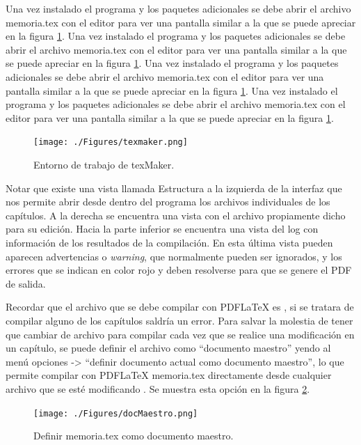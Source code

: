 Una vez instalado el programa y los paquetes adicionales se debe abrir el archivo memoria.tex con el editor para ver una pantalla similar a la que se puede apreciar en la figura \ref{fig:texmaker}. 
Una vez instalado el programa y los paquetes adicionales se debe abrir el archivo memoria.tex con el editor para ver una pantalla similar a la que se puede apreciar en la figura \ref{fig:texmaker}. 
Una vez instalado el programa y los paquetes adicionales se debe abrir el archivo memoria.tex con el editor para ver una pantalla similar a la que se puede apreciar en la figura \ref{fig:texmaker}. 
Una vez instalado el programa y los paquetes adicionales se debe abrir el archivo memoria.tex con el editor para ver una pantalla similar a la que se puede apreciar en la figura \ref{fig:texmaker}. 

\vspace{1cm}

\begin{figure}[htbp]
	\centering
	\texttt{[image: ./Figures/texmaker.png]}
	\caption{Entorno de trabajo de texMaker.}
	\label{fig:texmaker}
\end{figure}

\vspace{1cm}

Notar que existe una vista llamada Estructura a la izquierda de la interfaz que nos permite abrir desde dentro del programa los archivos individuales de los capítulos.  A la derecha se encuentra una vista con el archivo propiamente dicho para su edición. Hacia la parte inferior se encuentra una vista del log con información de los resultados de la compilación.  En esta última vista pueden aparecen advertencias o \textit{warning}, que normalmente pueden ser ignorados, y los errores que se indican en color rojo y deben resolverse para que se genere el PDF de salida.

Recordar que el archivo que se debe compilar con PDFLaTeX es , si se tratara de compilar alguno de los capítulos saldría un error.  Para salvar la molestia de tener que cambiar de archivo para compilar cada vez que se realice una modificación en un capítulo, se puede definir el archivo  como ``documento maestro'' yendo al menú opciones -> ``definir documento actual como documento maestro'', lo que permite compilar con PDFLaTeX memoria.tex directamente desde cualquier archivo que se esté modificando . Se muestra esta opción en la figura \ref{fig:docMaestro}.

\begin{figure}[h]
	\centering
	\texttt{[image: ./Figures/docMaestro.png]}
	\caption{Definir memoria.tex como documento maestro.}
	\label{fig:docMaestro}
\end{figure}


